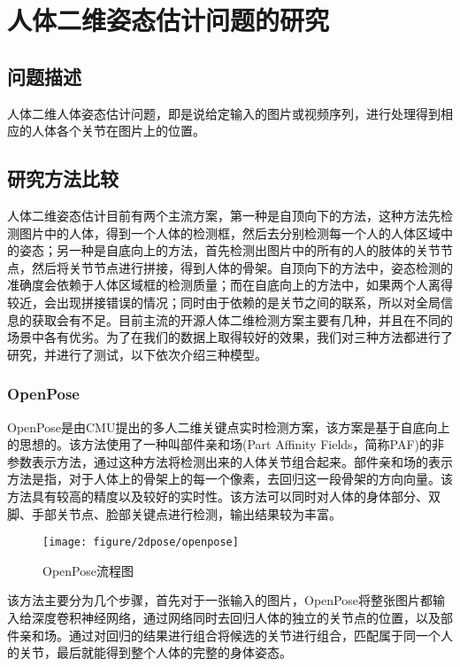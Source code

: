\section{人体二维姿态估计问题的研究}
\subsection{问题描述}
人体二维人体姿态估计问题，即是说给定输入的图片或视频序列，进行处理得到相应的人体各个关节在图片上的位置。

\subsection{研究方法比较}
人体二维姿态估计目前有两个主流方案，第一种是自顶向下的方法，这种方法先检测图片中的人体，得到一个人体的检测框，然后去分别检测每一个人的人体区域中的姿态；另一种是自底向上的方法，首先检测出图片中的所有的人的肢体的关节节点，然后将关节节点进行拼接，得到人体的骨架。自顶向下的方法中，姿态检测的准确度会依赖于人体区域框的检测质量；而在自底向上的方法中，如果两个人离得较近，会出现拼接错误的情况；同时由于依赖的是关节之间的联系，所以对全局信息的获取会有不足。目前主流的开源人体二维检测方案主要有几种，并且在不同的场景中各有优劣。为了在我们的数据上取得较好的效果，我们对三种方法都进行了研究，并进行了测试，以下依次介绍三种模型。

\subsubsection{OpenPose}
OpenPose是由CMU提出的多人二维关键点实时检测方案，该方案是基于自底向上的思想的。该方法使用了一种叫部件亲和场(Part Affinity Fields，简称PAF)的非参数表示方法，通过这种方法将检测出来的人体关节组合起来。部件亲和场的表示方法是指，对于人体上的骨架上的每一个像素，去回归这一段骨架的方向向量。该方法具有较高的精度以及较好的实时性。该方法可以同时对人体的身体部分、双脚、手部关节点、脸部关键点进行检测，输出结果较为丰富。
\begin{figure}[H]
    \centering
    \texttt{[image: figure/2dpose/openpose]}
    \caption{\label{fig:2d-op} OpenPose流程图}
\end{figure}
该方法主要分为几个步骤，首先对于一张输入的图片，OpenPose将整张图片都输入给深度卷积神经网络，通过网络同时去回归人体的独立的关节点的位置，以及部件亲和场。通过对回归的结果进行组合将候选的关节进行组合，匹配属于同一个人的关节，最后就能得到整个人体的完整的身体姿态。

